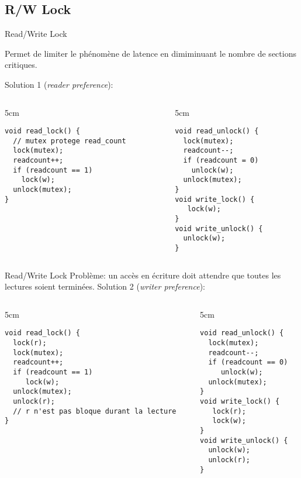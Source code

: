 \subsection{R/W Lock}

\begin{frame}[fragile]{Read/Write Lock}

Permet de limiter le phénomène  de latence en dimiminuant le nombre de
sections critiques.

Solution 1 (\emph{reader preference}):
\begin{columns}
  \begin{column} {5cm}
    \begin{lstlisting} 
void read_lock() {
  // mutex protege read_count
  lock(mutex);
  readcount++;
  if (readcount == 1)
    lock(w);
  unlock(mutex);
}
    \end{lstlisting} 
  \end{column}
  \begin{column} {5cm}
    \begin{lstlisting} 
void read_unlock() {
  lock(mutex);
  readcount--;
  if (readcount = 0)
    unlock(w);
  unlock(mutex);
}
void write_lock() {
   lock(w);
}
void write_unlock() {
  unlock(w);
}
    \end{lstlisting} 
  \end{column}
\end{columns}
\end{frame} 

\begin{frame}[fragile]{Read/Write Lock}
  Problème: un accès en écriture doit attendre que toutes les lectures
  soient terminées. Solution 2 (\emph{writer preference}):
  \begin{columns}
    \begin{column} {5cm}
      \begin{lstlisting} 
void read_lock() {
  lock(r);
  lock(mutex);
  readcount++;
  if (readcount == 1)
     lock(w);
  unlock(mutex);
  unlock(r);
  // r n'est pas bloque durant la lecture
}
       \end{lstlisting} 
     \end{column}
     \begin{column} {5cm}
       \begin{lstlisting} 
void read_unlock() {
  lock(mutex);
  readcount--;
  if (readcount == 0)
     unlock(w);
  unlock(mutex);
}
void write_lock() {
   lock(r);
   lock(w);
}
void write_unlock() {
  unlock(w);
  unlock(r);
}
      \end{lstlisting} 
    \end{column}
  \end{columns}
\end{frame} 

